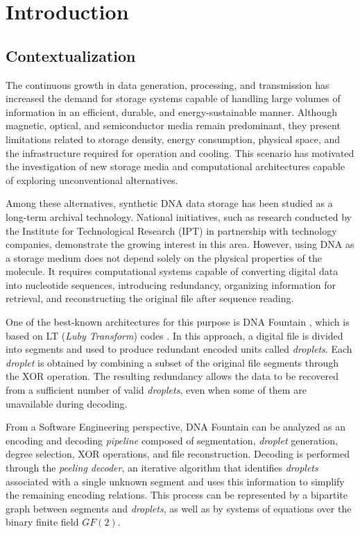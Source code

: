 \chapter{Introduction}

\section{Contextualization }
The continuous growth in data generation, processing, and transmission has increased the demand for storage systems capable of handling large volumes of information in an efficient, durable, and energy-sustainable manner. Although magnetic, optical, and semiconductor media remain predominant, they present limitations related to storage density, energy consumption, physical space, and the infrastructure required for operation and cooling. This scenario has motivated the investigation of new storage media and computational architectures capable of exploring unconventional alternatives.

Among these alternatives, synthetic DNA data storage has been studied as a long-term archival technology. National initiatives, such as research conducted by the Institute for Technological Research (IPT) in partnership with technology companies, demonstrate the growing interest in this area. However, using DNA as a storage medium does not depend solely on the physical properties of the molecule. It requires computational systems capable of converting digital data into nucleotide sequences, introducing redundancy, organizing information for retrieval, and reconstructing the original file after sequence reading.

One of the best-known architectures for this purpose is DNA Fountain \cite{erlich2017}, which is based on LT (\emph{Luby Transform}) codes \cite{luby2002}. In this approach, a digital file is divided into segments and used to produce redundant encoded units called \emph{droplets}. Each \emph{droplet} is obtained by combining a subset of the original file segments through the XOR operation. The resulting redundancy allows the data to be recovered from a sufficient number of valid \emph{droplets}, even when some of them are unavailable during decoding.

From a Software Engineering perspective, DNA Fountain can be analyzed as an encoding and decoding \emph{pipeline} composed of segmentation, \emph{droplet} generation, degree selection, XOR operations, and file reconstruction. Decoding is performed through the \emph{peeling decoder}, an iterative algorithm that identifies \emph{droplets} associated with a single unknown segment and uses this information to simplify the remaining encoding relations. This process can be represented by a bipartite graph between segments and \emph{droplets}, as well as by systems of equations over the binary finite field \(GF(2)\).

